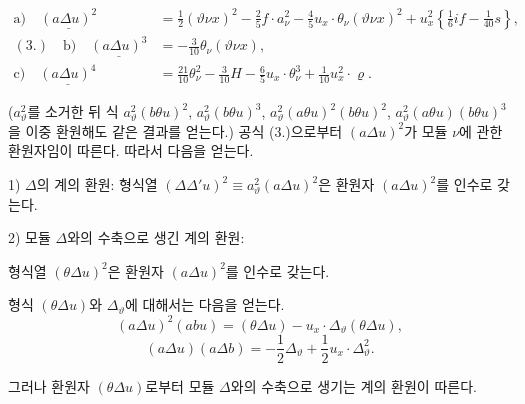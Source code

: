 
\[
\begin{aligned}
\text{a)}\quad \underline{(a\Delta u)^2}
&=\frac12(\vartheta \nu x)^2-\frac25f\cdot a_\nu^2
-\frac45u_x\cdot\theta_\nu(\vartheta \nu x)^2
+u_x^2\left\{\frac16i f-\frac1{40}s\right\},\\
(3.)\quad\text{b)}\quad \underline{(a\Delta u)^3}
&=-\frac3{10}\theta_\nu(\vartheta \nu x),\\
\text{c)}\quad \underline{(a\Delta u)^4}
&=\frac{21}{10}\theta_\nu^2-\frac3{10}H
-\frac65u_x\cdot\theta_\nu^3+\frac1{10}u_x^2\cdot\varrho.
\end{aligned}
\]

($a_\vartheta^2$를 소거한 뒤 식 $a_\vartheta^2(b\theta u)^2$, $a_\vartheta^2(b\theta u)^3$, $a_\vartheta^2(a\theta u)^2(b\theta u)^2$, $a_\vartheta^2(a\theta u)(b\theta u)^3$을 이중 환원해도 같은 결과를 얻는다.)
공식 (3.)으로부터 $(a\Delta u)^2$가 모듈 $\nu$에 관한 환원자임이 따른다. 따라서 다음을 얻는다.

1) $\Delta$의 계의 환원: 형식열 $(\Delta\Delta' u)^2\equiv a_\vartheta^2(a\Delta u)^2$은 환원자 $(a\Delta u)^2$를 인수로 갖는다.

2) 모듈 $\Delta$와의 수축으로 생긴 계의 환원:

형식열 $(\theta\Delta u)^2$은 환원자 $(a\Delta u)^2$를 인수로 갖는다.

형식 $(\theta\Delta u)$와 $\Delta_\vartheta$에 대해서는 다음을 얻는다.
\[
(a\Delta u)^2(abu)=(\theta\Delta u)-u_x\cdot\Delta_\vartheta(\theta\Delta u),
\]
\[
(a\Delta u)(a\Delta b)=-\frac12\Delta_\vartheta+\frac12u_x\cdot\Delta_\vartheta^2.
\]

그러나 환원자 $(\theta\Delta u)$로부터 모듈 $\Delta$와의 수축으로 생기는 계의 환원이 따른다.
